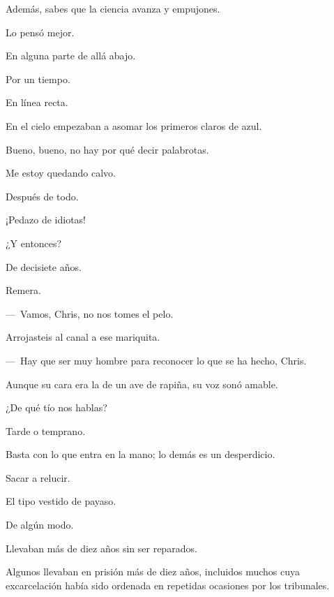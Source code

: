 \sk
Además, sabes que la ciencia avanza  y empujones. 

\sk
Lo pensó mejor. 

\sk
En alguna parte de allá abajo. 

\sk
Por un tiempo. 

\sk
En línea recta. 

\sk
En el cielo empezaban a asomar los primeros claros de azul. \nb{}

\sk
Bueno, bueno, no hay por qué decir palabrotas. 

\sk
Me estoy quedando calvo. 

\sk
Después de todo. 

\sk
¡Pedazo de idiotas! 

\sk
¿Y entonces? 

\sk
De decisiete años. 

\sk
Remera. 

\sk
---~Vamos, Chris, no nos tomes el pelo. 

\sk
Arrojasteis al canal a ese mariquita. 

\sk
---~Hay que ser muy hombre para reconocer lo que se ha hecho, Chris. \nb{}

\sk
Aunque su cara era la de un ave de rapiña, su voz sonó amable. 

\sk
¿De qué tío nos hablas? 

\sk
Tarde o temprano. 

\sk
Basta con lo que entra en la mano; lo demás es un desperdicio. 

\sk
Sacar a relucir. 

\sk
El tipo vestido de payaso. \nb{}

\sk
De algún modo. 

\sk
Llevaban más de diez años sin ser reparados. 

\sk
Algunos llevaban en prisión más de diez años, incluidos muchos cuya excarcelación había sido ordenada en repetidas ocasiones por los tribunales.


